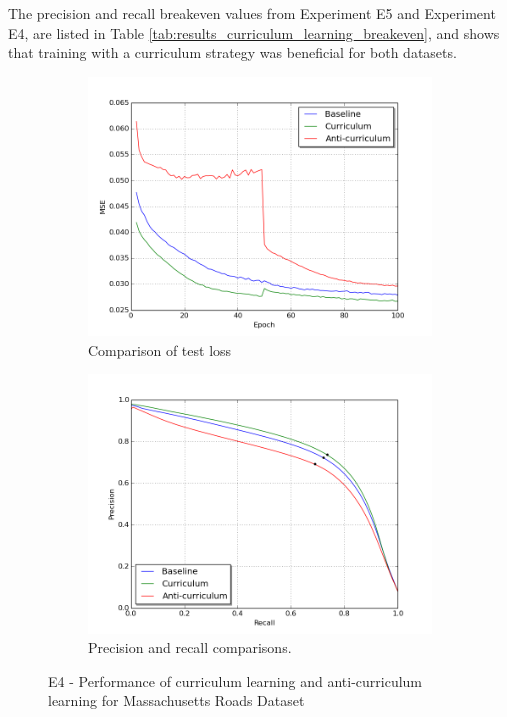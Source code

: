 The precision and recall breakeven values from Experiment E5 and Experiment E4, are listed in Table \ref{tab:results_curriculum_learning_breakeven}, and shows that training with a curriculum strategy was beneficial for both datasets.\\
\begin{figure}
\begin{subfigure}{0.5\textwidth}
\includegraphics[width=\linewidth]{figs/E2/E2-lc.png}
\caption{Comparison of test loss} \label{fig:E4_curr_mass_loss}
\end{subfigure}
\hspace*{\fill} %
\begin{subfigure}{0.5\textwidth}
\includegraphics[width=\linewidth]{figs/E2/E2-pr.png}
\caption{Precision and recall comparisons.} \label{fig:E4_curr_mass_pr}
\end{subfigure}
\hspace*{\fill} %
\caption[E4 - Performance of curriculum learning for Massachusetts Roads Dataset]{E4 - Performance of curriculum learning and anti-curriculum learning for Massachusetts Roads Dataset} \label{fig:E4_curriculum_mass}
\end{figure}

